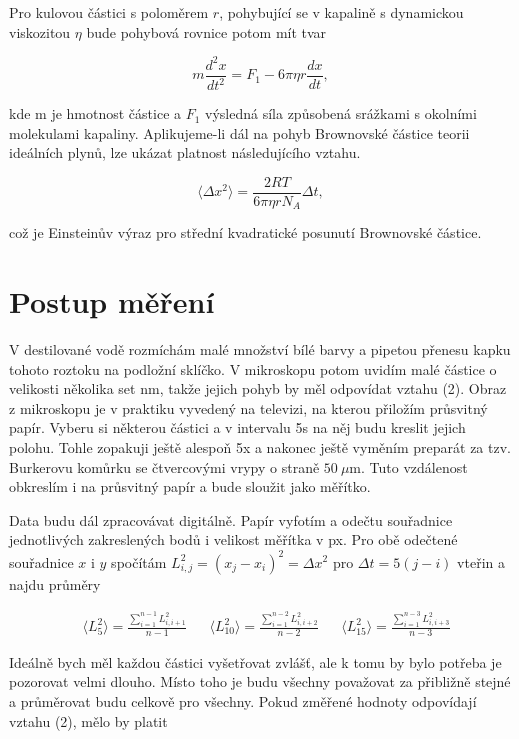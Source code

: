 \documentclass[a4paper,11pt]{article}
\begin{document}
Pro kulovou částici s poloměrem $ r $, pohybující se v kapalině s dynamickou viskozitou $ \eta $ bude pohybová rovnice potom mít tvar

\begin{equation}
m \frac{d^2x}{dt^2} = F_1 -6 \pi \eta r \frac{dx}{dt},
\end{equation}

\noindent 
kde m je hmotnost částice a $ F_1 $ výsledná síla způsobená srážkami s okolními molekulami kapaliny. Aplikujeme-li dál na pohyb Brownovské částice teorii ideálních plynů, lze ukázat platnost následujícího vztahu.

\begin{equation}
    \langle \Delta x^2 \rangle = \frac{2RT}{6 \pi \eta r N_A}\Delta t, 
\end{equation}

\noindent
což je Einsteinův výraz pro střední kvadratické posunutí Brownovské částice.

\section{Postup měření}

V destilované vodě rozmíchám malé množství bílé barvy a pipetou přenesu kapku tohoto roztoku na podložní sklíčko. V mikroskopu potom uvidím malé částice o velikosti několika set nm, takže jejich pohyb by měl odpovídat vztahu (2). Obraz z mikroskopu je v praktiku vyvedený na televizi, na kterou přiložím průsvitný papír. Vyberu si některou částici a v intervalu 5s na něj budu kreslit jejich polohu. Tohle zopakuji ještě alespoň 5x a nakonec ještě vyměním preparát za tzv. Burkerovu komůrku se čtvercovými vrypy o straně $ 50 \ \mu $m. Tuto vzdálenost obkreslím i na průsvitný papír a bude sloužit jako měřítko.

Data budu dál zpracovávat digitálně. Papír vyfotím a odečtu souřadnice jednotlivých zakreslených bodů i velikost měřítka v px. Pro obě odečtené souřadnice $ x $ i $ y $ spočítám $ L^2_{i,j} = (x_{j} - x_{i})^2 = \Delta x^2 $ pro $\Delta t = 5(j - i) $ vteřin a najdu průměry


\begin{align*}
   & \langle L^2_{5} \rangle = \frac{\sum_{i=1}^{n-1} L^2_{i, i+1}}{n-1} & 
   & \langle L^2_{10} \rangle = \frac{\sum_{i=1}^{n-2} L^2_{i, i+2}}{n-2} & 
   & \langle L^2_{15} \rangle = \frac{\sum_{i=1}^{n-3} L^2_{i, i+3}}{n-3} 
\end{align*}

Ideálně bych měl každou částici vyšetřovat zvlášť, ale k tomu by bylo potřeba je pozorovat velmi dlouho. Místo toho je budu všechny považovat za přibližně stejné a průměrovat budu celkově pro všechny. Pokud změřené hodnoty odpovídají vztahu (2), mělo by platit
\end{document}
